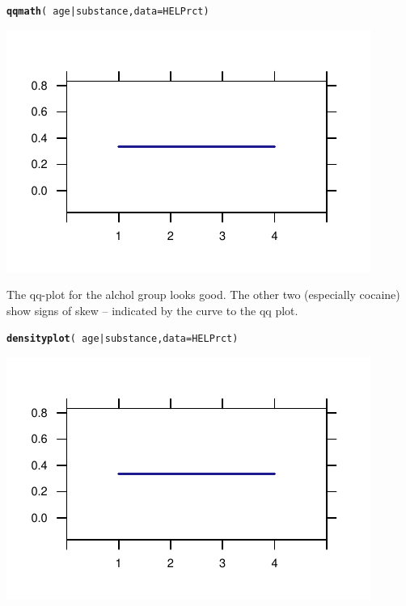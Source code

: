 \documentclass[twoside]{book}\usepackage[]{graphicx}\usepackage[]{xcolor}
\makeatletter
\def\maxwidth{ %
  \ifdim\Gin@nat@width>\linewidth
    \linewidth
  \else
    \Gin@nat@width
  \fi
}
\newcommand{\hlopt}[1]{\textcolor[rgb]{0,0,0}{#1}}%
\newcommand{\hlstd}[1]{\textcolor[rgb]{0.345,0.345,0.345}{#1}}%
\newcommand{\hlkwc}[1]{\textcolor[rgb]{0.333,0.667,0.333}{#1}}%
\newcommand{\hlkwd}[1]{\textcolor[rgb]{0.737,0.353,0.396}{\textbf{#1}}}%
\newenvironment{kframe}{%
 \def\at@end@of@kframe{}%
 \ifinner\ifhmode%
  \def\at@end@of@kframe{\end{minipage}}%
  \begin{minipage}{\columnwidth}%
 \fi\fi%
 \def\FrameCommand##1{\hskip\@totalleftmargin \hskip-\fboxsep
 \colorbox{shadecolor}{##1}\hskip-\fboxsep
     \hskip-\linewidth \hskip-\@totalleftmargin \hskip\columnwidth}%
 \MakeFramed {\advance\hsize-\width
   \@totalleftmargin\z@ \linewidth\hsize
   \@setminipage}}%
 {\par\unskip\endMakeFramed%
 \at@end@of@kframe}
\newenvironment{knitrout}{}{} %
\makeatother
\begin{document}
\begin{solution}
\begin{knitrout}
\color{fgcolor}\begin{kframe}
\begin{alltt}
\hlkwd{qqmath}\hlstd{(}\hlopt{~}\hlstd{age} \hlopt{|} \hlstd{substance,} \hlkwc{data} \hlstd{= HELPrct)}
\end{alltt}
\end{kframe}

{\centering \includegraphics[width=\maxwidth]{figures/fig-unnamed-chunk-76-1} 

}



\end{knitrout}
The qq-plot for the alchol group looks good.  The other two (especially cocaine) show
signs of skew -- indicated by the curve to the qq plot.
\begin{knitrout}
\color{fgcolor}\begin{kframe}
\begin{alltt}
\hlkwd{densityplot}\hlstd{(}\hlopt{~}\hlstd{age} \hlopt{|} \hlstd{substance,} \hlkwc{data} \hlstd{= HELPrct)}
\end{alltt}
\end{kframe}

{\centering \includegraphics[width=\maxwidth]{figures/fig-unnamed-chunk-77-1} 

}



\end{knitrout}
\end{solution}
\end{document}
